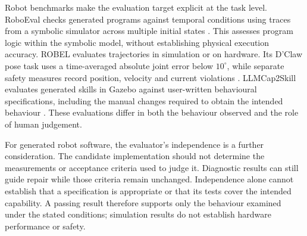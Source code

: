 Robot benchmarks make the evaluation target explicit at the task level.
RoboEval checks generated programs against temporal conditions using traces
from a symbolic simulator across multiple initial states
\citep{hu2024codebotler}. This assesses program logic within the symbolic
model, without establishing physical execution accuracy. ROBEL evaluates
trajectories in simulation or on hardware. Its D'Claw pose task uses a
time-averaged absolute joint error below \(10^\circ\), while separate safety
measures record position, velocity and current violations
\citep{ahn2020robel}. LLMCap2Skill evaluates generated skills in Gazebo against
user-written behavioural specifications, including the manual changes required
to obtain the intended behaviour \citep{vieira2025cap2skill}. These evaluations
differ in both the behaviour observed and the role of human judgement.

For generated robot software, the evaluator's independence is a further
consideration. The candidate implementation should not determine the
measurements or acceptance criteria used to judge it. Diagnostic results can
still guide repair while those criteria remain unchanged. Independence alone
cannot establish that a specification is appropriate or that its tests cover
the intended capability. A passing result therefore supports only the behaviour
examined under the stated conditions; simulation results do not establish
hardware performance or safety.
